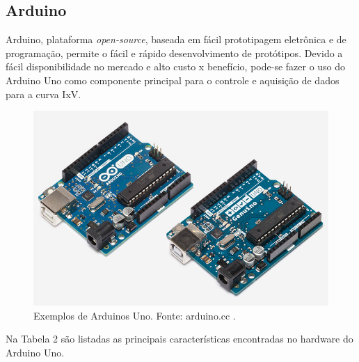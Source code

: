 \subsection{Arduino}
Arduino, plataforma \textit{open-source}, baseada em fácil prototipagem eletrônica e de programação, permite o fácil e rápido desenvolvimento de protótipos. Devido a fácil disponibilidade no mercado e alto custo x benefício, pode-se fazer o uso do Arduino Uno como componente principal para o controle e aquisição de dados para a curva IxV.

\FloatBarrier
\begin{figure}[!htbp]
	\centering
	\includegraphics[scale=0.6]{imagens/Uno}
	\caption{Exemplos de Arduinos Uno. Fonte: arduino.cc . }
	
	\label{fig:ArduinoUno}
\end{figure}
\FloatBarrier

Na Tabela 2 são listadas as principais características encontradas no hardware do Arduino Uno.


